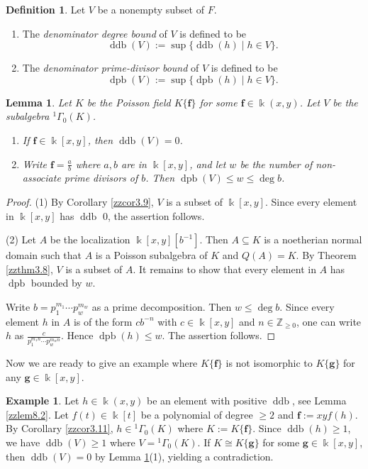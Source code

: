 \documentclass[12pt]{amsart}
\theoremstyle{plain}
\newtheorem{lemma}[theorem]{Lemma}
\numberwithin{theorem}{section}
\numberwithin{equation}{theorem}
\theoremstyle{definition}
\newtheorem{definition}[theorem]{Definition}
\newtheorem{example}[theorem]{Example}
\newcommand{\ZZ}{\mathbb{Z}}
\DeclareMathOperator{\ddb}{ddb}
\DeclareMathOperator{\dpb}{dpb}
\newcommand \bff {{\mathbf{f}}}
\newcommand \bfg {{\mathbf{g}}}
\newcommand \Znn {\ZZ_{\ge 0}}
\begin{document}
\begin{definition}
\label{zzdef8.3}
Let $V$ be a nonempty subset of $F$. 
\begin{enumerate}
\item[(1)]
The {\it denominator degree bound} 
of $V$ is defined to be
$$\ddb(V) :=\sup\{\ddb(h)\mid h\in V\}.$$
\item[(2)]
The {\it denominator prime-divisor bound} 
of $V$ is defined to be
$$\dpb(V) :=\sup\{\dpb(h)\mid h\in V\}.$$
\end{enumerate}
\end{definition}


\begin{lemma}
\label{zzlem8.4}
Let $K$ be the Poisson field $K\{\bff\}$ for some $\bff\in
\Bbbk(x,y)$. Let $V$ be the subalgebra ${^1\Gamma}_{0}(K)$.
\begin{enumerate}
\item[(1)]
If $\bff\in \Bbbk[x,y]$, then $\ddb(V)=0$.
\item[(2)]
Write $\bff=\frac{a}{b}$ where $a,b$ are in $\Bbbk[x,y]$, and 
let $w$ be the number of non-associate prime divisors of $b$. 
Then $\dpb(V)\leq w \le \deg b$.
\end{enumerate}
\end{lemma}


\begin{proof}
(1) By Corollary \ref{zzcor3.9}, $V$ is a subset of $\Bbbk[x,y]$.
Since every element in $\Bbbk[x,y]$ has $\ddb$ 0, the assertion
follows.

(2) Let $A$ be the localization $\Bbbk[x,y][b^{-1}]$. Then 
$A\subseteq K$ is a noetherian normal domain such that $A$ is a Poisson 
subalgebra of $K$ and $Q(A)=K$. By Theorem \ref{zzthm3.8}, 
$V$ is a subset of $A$. It remains to show that every
element in $A$ has $\dpb$ bounded by $w$.

Write $b=p_1^{m_1}\cdots p_{w}^{m_w}$ as a prime decomposition. 
Then $w\leq \deg b$. Since every element $h$ in $A$ is of the 
form $c b^{-n}$ with $c \in \Bbbk[x,y]$ and $n \in \Znn$, one 
can write $h$ as $\frac{c}{p_1^{m_1n}\cdots p_{w}^{m_wn}}$. 
Hence $\dpb(h)\leq w$. The assertion follows.
\end{proof}

Now we are ready to give an example where $K\{\bff\}$ is not 
isomorphic to $K\{\bfg\}$ for any $\bfg\in \Bbbk[x,y]$.

\begin{example}
\label{zzexa8.5}  
Let $h \in \Bbbk(x,y)$ be an element with positive $\ddb$, see 
Lemma \ref{zzlem8.2}. Let $f(t) \in \Bbbk[t]$ be a polynomial of degree 
$\geq 2$ and $\bff :=xyf(h)$. By Corollary \ref{zzcor3.11}, 
$h\in {^1\Gamma}_{0}(K)$ where $K:=K\{\bff\}$. Since 
$\ddb(h)\geq 1$, we have $\ddb(V)\geq 1$ where 
$V={^1\Gamma}_{0}(K)$. If $K\cong K\{\bfg\}$ for some 
$\bfg\in \Bbbk[x,y]$, then $\ddb(V)=0$ by Lemma 
\ref{zzlem8.4}(1), yielding a contradiction.
\end{example}
\end{document}
